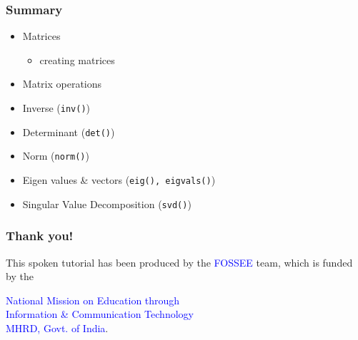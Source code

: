 \documentclass[presentation]{beamer}
\begin{document}
\begin{frame}
\frametitle{Summary}
\label{sec-14}

\begin{itemize}
\item Matrices

\begin{itemize}
\item creating matrices
\end{itemize}

\item Matrix operations
\item Inverse (\texttt{inv()})
\item Determinant (\texttt{det()})
\item Norm (\texttt{norm()})
\item Eigen values \& vectors (\texttt{eig(), eigvals()})
\item Singular Value Decomposition (\texttt{svd()})
\end{itemize}
\end{frame}
\begin{frame}
\frametitle{Thank you!}
\label{sec-15}

  \begin{block}{}
  \begin{center}
  This spoken tutorial has been produced by the
  \textcolor{blue}{FOSSEE} team, which is funded by the 
  \end{center}
  \begin{center}
    \textcolor{blue}{National Mission on Education through \\
      Information \& Communication Technology \\ 
      MHRD, Govt. of India}.
  \end{center}  
  \end{block}

  
\end{frame}
\end{document}
